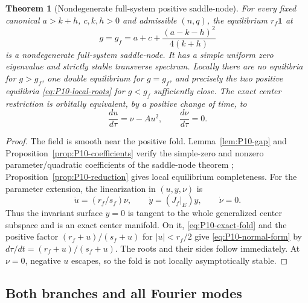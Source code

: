 \documentclass[11pt]{article}
\let\OriginalCite\cite
\renewcommand{\cite}[2][]{%
  \textcolor{CitationRed}{%
    \if\relax\detokenize{#1}\relax
      \OriginalCite{#2}%
    \else
      \OriginalCite[#1]{#2}%
    \fi}}
\newcommand{\one}{\mathbf{1}}
\newtheorem{theorem}{Theorem}[section]
\theoremstyle{definition}
\theoremstyle{remark}
\begin{document}
\begin{theorem}[Nondegenerate full-system positive saddle-node]
\label{thm:P10-saddle-node}
For every fixed canonical $a>k+h$, $c,k,h>0$ and admissible $(n,q)$,
the equilibrium $r_f\one$ at
\[
 \boxed{g=g_f=a+c+\frac{(a-k-h)^2}{4(k+h)}}
\]
is a nondegenerate full-system saddle-node. It has a simple uniform
zero eigenvalue and strictly stable transverse spectrum. Locally there
are no equilibria for $g>g_f$, one double equilibrium for $g=g_f$,
and precisely the two positive equilibria \eqref{eq:P10-local-roots}
for $g<g_f$ sufficiently close. The exact center restriction is
orbitally equivalent, by a positive change of time, to
\begin{equation}
 \boxed{\frac{du}{d\tau}=\nu-Au^2,\qquad \frac{d\nu}{d\tau}=0.}
 \label{eq:P10-normal-form}
\end{equation}
\end{theorem}
\begin{proof}
The field is smooth near the positive fold. Lemma~\ref{lem:P10-gap}
and Proposition~\ref{prop:P10-coefficients} verify the simple-zero
and nonzero parameter/quadratic coefficients of the saddle-node theorem
\cite{KuznetsovFold2006,GuckenheimerHolmes1983};
Proposition~\ref{prop:P10-reduction} gives local equilibrium completeness.
For the parameter extension, the linearization in $(u,y,\nu)$ is
\begin{equation}
 \dot u=(r_f/s_f)\nu,\qquad \dot y=(J_f|_E)y,\qquad\dot\nu=0.
 \label{eq:P10-extended-linear}
\end{equation}
Thus the invariant surface $y=0$ is tangent to the whole generalized
center subspace and is an exact center manifold. On it,
\eqref{eq:P10-exact-fold} and the positive factor
$(r_f+u)/(s_f+u)$ for $|u|<r_f/2$ give
\eqref{eq:P10-normal-form} by $d\tau/dt=(r_f+u)/(s_f+u)$.
The roots and their sides follow immediately. At $\nu=0$, negative
$u$ escapes, so the fold is not locally asymptotically stable.
\end{proof}

\subsection{Both branches and all Fourier modes}
\label{slot:P10-2}
\end{document}
